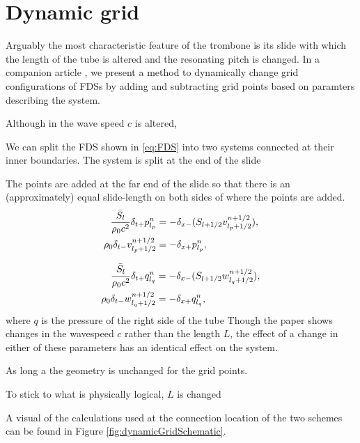 \section{Dynamic grid}\label{sec:dynamicGrid}
Arguably the most characteristic feature of the trombone is its slide with which the length of the tube is altered and the resonating pitch is changed. In a companion article \cite{Willemsen2021}, we present a method to dynamically change grid configurations of FDSs by adding and subtracting grid points based on paramters describing the system.

Although in \cite{Willemsen2021} the wave speed $c$ is altered, 

We can split the FDS shown in \eqref{eq:FDS} into two systems connected at their inner boundaries. The system is split at the end of the slide

The points are added at the far end of the slide so that there is an (approximately) equal slide-length on both sides of where the points are added. 
\begin{subequations}
    \begin{align}
        \frac{\bar S_{l}}{\rho_0 c^2}\delta_{t+}p_{l_p}^n &= -\delta_{x-}(S_{{l}+1/2}v_{{l_p}+1/2}^{n+1/2}),\label{eq:discPressure}\\
        \rho_0 \delta_{t-}v_{{l_p}+1/2}^{n+1/2}&=-\delta_{x+}p_{l_p}^n,\label{eq:discVelocity}
    \end{align}
\end{subequations}

\begin{subequations}
    \begin{align}
        \frac{\bar S_{l}}{\rho_0 c^2}\delta_{t+}q_{l_q}^n &= -\delta_{x-}(S_{{l}+1/2}w_{{l_q}+1/2}^{n+1/2}),\label{eq:discPressure}\\
        \rho_0 \delta_{t-}w_{{l_q}+1/2}^{n+1/2}&=-\delta_{x+}q_{l_q}^n,\label{eq:discVelocity}
    \end{align}
\end{subequations}
where $q$ is the pressure of the right side of the tube
Though the paper shows changes in the wavespeed $c$ rather than the length $L$, the effect of a change in either of these parameters has an identical effect on the system. 

As long a the geometry is unchanged for the grid points. 

To stick to what is physically logical, $L$ is changed


A visual of the calculations used at the connection location of the two schemes can be found in Figure \ref{fig:dynamicGridSchematic}.




